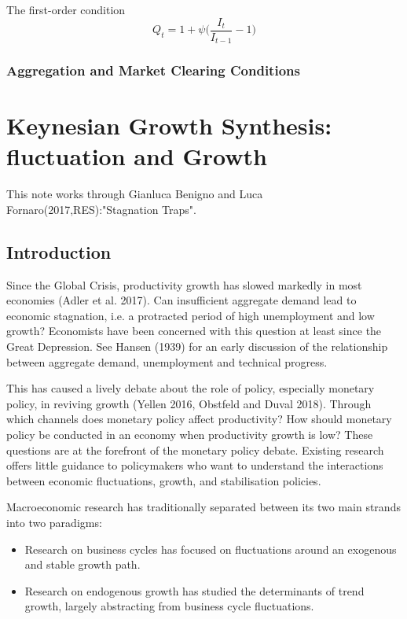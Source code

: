 \documentclass[cn,10pt,math=newtx,citestyle=gb7714-2015,bibstyle=gb7714-2015]{elegantbook}
\begin{document}
{{			The first-order condition
			\begin{equation}
				Q_t=1+\psi\bigg(\frac{I_t}{I_{t-1}}-1\bigg)
			\end{equation}
			
			
			\subsection{Aggregation and Market Clearing Conditions}
			
	\chapter{Keynesian Growth Synthesis: fluctuation and Growth}

    This note works through Gianluca Benigno and Luca Fornaro(2017,RES):"Stagnation Traps".
	\section{Introduction}
	Since the Global Crisis, productivity growth has slowed markedly in most economies (Adler et al. 2017). Can insufficient aggregate demand lead to economic stagnation, i.e. a protracted period of high unemployment and low growth? Economists have been concerned with this question at least since the Great Depression. See Hansen (1939) for an early discussion of the relationship between aggregate demand, unemployment and technical progress. 
	
	This has caused a lively debate about the role of policy, especially monetary policy, in reviving growth (Yellen 2016, Obstfeld and Duval 2018). Through which channels does monetary policy affect productivity? How should monetary policy be conducted in an economy when productivity growth is low? These questions are at the forefront of the monetary policy debate. Existing research offers little guidance to policymakers who want to understand the interactions between economic fluctuations, growth, and stabilisation policies. 
	
	Macroeconomic research has traditionally separated between its two main strands into two paradigms:
	
	\begin{itemize}
		\item Research on business cycles has focused on fluctuations around an exogenous and stable growth path.
		\item Research on endogenous growth has studied the determinants of trend growth, largely abstracting from business cycle fluctuations.
	\end{itemize}

}}
\end{document}
